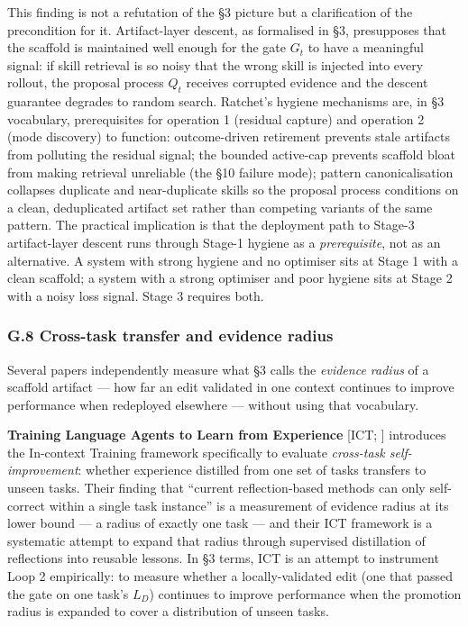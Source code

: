 This finding is not a refutation of the §3 picture but a clarification
of the precondition for it. Artifact-layer descent, as formalised in §3,
presupposes that the scaffold is maintained well enough for the gate
\(G_t\) to have a meaningful signal: if skill retrieval is so noisy that
the wrong skill is injected into every rollout, the proposal process
\(Q_t\) receives corrupted evidence and the descent guarantee degrades
to random search. Ratchet's hygiene mechanisms are, in §3 vocabulary,
prerequisites for operation 1 (residual capture) and operation 2 (mode
discovery) to function: outcome-driven retirement prevents stale
artifacts from polluting the residual signal; the bounded active-cap
prevents scaffold bloat from making retrieval unreliable (the §10
failure mode); pattern canonicalisation collapses duplicate and
near-duplicate skills so the proposal process conditions on a clean,
deduplicated artifact set rather than competing variants of the same
pattern. The practical implication is that the deployment path to
Stage-3 artifact-layer descent runs through Stage-1 hygiene as a
\emph{prerequisite}, not as an alternative. A system with strong hygiene
and no optimiser sits at Stage 1 with a clean scaffold; a system with a
strong optimiser and poor hygiene sits at Stage 2 with a noisy loss
signal. Stage 3 requires both.

\subsubsection{G.8 Cross-task transfer and evidence
radius}\label{g.8-cross-task-transfer-and-evidence-radius}

Several papers independently measure what §3 calls the \emph{evidence
radius} of a scaffold artifact --- how far an edit validated in one
context continues to improve performance when redeployed elsewhere ---
without using that vocabulary.

\textbf{Training Language Agents to Learn from Experience} {[}ICT;
\citet{shalev2026ict}{]} introduces the In-context Training framework
specifically to evaluate \emph{cross-task self-improvement}: whether
experience distilled from one set of tasks transfers to unseen tasks.
Their finding that ``current reflection-based methods can only
self-correct within a single task instance'' is a measurement of
evidence radius at its lower bound --- a radius of exactly one task ---
and their ICT framework is a systematic attempt to expand that radius
through supervised distillation of reflections into reusable lessons. In
§3 terms, ICT is an attempt to instrument Loop 2 empirically: to measure
whether a locally-validated edit (one that passed the gate on one task's
\(L_D\)) continues to improve performance when the promotion radius is
expanded to cover a distribution of unseen tasks.

